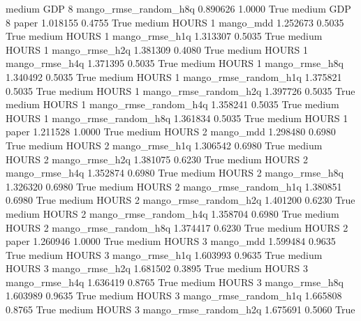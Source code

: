     medium      GDP                 8 mango_rmse_random_h8q   0.890626      1.0000    True
    medium      GDP                 8                 paper   1.018155      0.4755    True
    medium    HOURS                 1             mango_mdd   1.252673      0.5035    True
    medium    HOURS                 1        mango_rmse_h1q   1.313307      0.5035    True
    medium    HOURS                 1        mango_rmse_h2q   1.381309      0.4080    True
    medium    HOURS                 1        mango_rmse_h4q   1.371395      0.5035    True
    medium    HOURS                 1        mango_rmse_h8q   1.340492      0.5035    True
    medium    HOURS                 1 mango_rmse_random_h1q   1.375821      0.5035    True
    medium    HOURS                 1 mango_rmse_random_h2q   1.397726      0.5035    True
    medium    HOURS                 1 mango_rmse_random_h4q   1.358241      0.5035    True
    medium    HOURS                 1 mango_rmse_random_h8q   1.361834      0.5035    True
    medium    HOURS                 1                 paper   1.211528      1.0000    True
    medium    HOURS                 2             mango_mdd   1.298480      0.6980    True
    medium    HOURS                 2        mango_rmse_h1q   1.306542      0.6980    True
    medium    HOURS                 2        mango_rmse_h2q   1.381075      0.6230    True
    medium    HOURS                 2        mango_rmse_h4q   1.352874      0.6980    True
    medium    HOURS                 2        mango_rmse_h8q   1.326320      0.6980    True
    medium    HOURS                 2 mango_rmse_random_h1q   1.380851      0.6980    True
    medium    HOURS                 2 mango_rmse_random_h2q   1.401200      0.6230    True
    medium    HOURS                 2 mango_rmse_random_h4q   1.358704      0.6980    True
    medium    HOURS                 2 mango_rmse_random_h8q   1.374417      0.6230    True
    medium    HOURS                 2                 paper   1.260946      1.0000    True
    medium    HOURS                 3             mango_mdd   1.599484      0.9635    True
    medium    HOURS                 3        mango_rmse_h1q   1.603993      0.9635    True
    medium    HOURS                 3        mango_rmse_h2q   1.681502      0.3895    True
    medium    HOURS                 3        mango_rmse_h4q   1.636419      0.8765    True
    medium    HOURS                 3        mango_rmse_h8q   1.603989      0.9635    True
    medium    HOURS                 3 mango_rmse_random_h1q   1.665808      0.8765    True
    medium    HOURS                 3 mango_rmse_random_h2q   1.675691      0.5060    True
